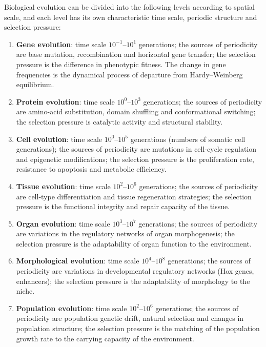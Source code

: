 \begin{definition}\label{def:evolution_hierarchy}
Biological evolution can be divided into the following levels according to spatial scale, and each level has its own characteristic time scale, periodic structure and selection pressure:
\begin{enumerate}[label=(\roman*)]
    \item \textbf{Gene evolution}: time scale $10^{-1}$--$10^1$ generations; the sources of periodicity are base mutation, recombination and horizontal gene transfer; the selection pressure is the difference in phenotypic fitness. The change in gene frequencies is the dynamical process of departure from Hardy--Weinberg equilibrium.
    \item \textbf{Protein evolution}: time scale $10^0$--$10^3$ generations; the sources of periodicity are amino-acid substitution, domain shuffling and conformational switching; the selection pressure is catalytic activity and structural stability.
    \item \textbf{Cell evolution}: time scale $10^0$--$10^5$ generations (numbers of somatic cell generations); the sources of periodicity are mutations in cell-cycle regulation and epigenetic modifications; the selection pressure is the proliferation rate, resistance to apoptosis and metabolic efficiency.
    \item \textbf{Tissue evolution}: time scale $10^2$--$10^6$ generations; the sources of periodicity are cell-type differentiation and tissue regeneration strategies; the selection pressure is the functional integrity and repair capacity of the tissue.
    \item \textbf{Organ evolution}: time scale $10^3$--$10^7$ generations; the sources of periodicity are variations in the regulatory networks of organ morphogenesis; the selection pressure is the adaptability of organ function to the environment.
    \item \textbf{Morphological evolution}: time scale $10^4$--$10^8$ generations; the sources of periodicity are variations in developmental regulatory networks (Hox genes, enhancers); the selection pressure is the adaptability of morphology to the niche.
    \item \textbf{Population evolution}: time scale $10^2$--$10^6$ generations; the sources of periodicity are population genetic drift, natural selection and changes in population structure; the selection pressure is the matching of the population growth rate to the carrying capacity of the environment.

\end{enumerate}
\end{definition}
